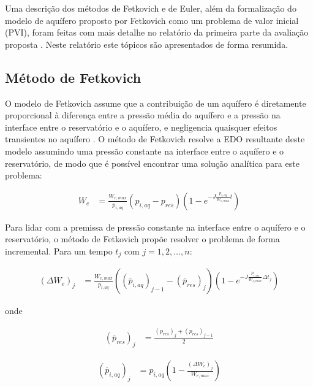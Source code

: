 \documentclass[final,5p]{elsarticle}
\numberwithin{equation}{section}
\begin{document}
        Uma descrição dos métodos de Fetkovich e de Euler, além da formalização do modelo de aquífero proposto por Fetkovich como um problema de valor inicial (PVI), foram feitas com mais detalhe no relatório da primeira parte da avaliação proposta \cite{relatorioeuler}. Neste relatório este tópicos são apresentados de forma resumida.

    \subsection{Método de Fetkovich}

        O modelo de Fetkovich assume que a contribuição de um aquífero é diretamente proporcional à diferença entre a pressão média do aquífero e a pressão na interface entre o reservatório e o aquífero, e negligencia quaisquer efeitos transientes no aquífero \cite{fetkovich1971simplified}. O método de Fetkovich resolve a EDO resultante deste modelo assumindo uma pressão constante na interface entre o aquífero e o reservatório, de modo que é possível encontrar uma solução analítica para este problema:

        \begin{align}
            W_e &= \frac{W_{e,max}}{p_{i,aq}} (p_{i,aq} - p_{res}) \left( 1- e^{-J\frac{p_{i,aq}}{W_{e,max}} t} \right) \label{eq:we}
        \end{align}

        Para lidar com a premissa de pressão constante na interface entre o aquífero e o reservatório, o método de Fetkovich propõe resolver o problema de forma incremental. Para um tempo $t_j$ com $j=1,2,\ldots,n$:

        \begin{align}
            (\Delta W_e)_j &= \frac{W_{e,max}}{p_{i,aq}} ((\overline{p}_{i,aq})_{j-1} - (\overline{p}_{res})_j) \left( 1- e^{-J\frac{p_{i,aq}}{W_{e,max}} \Delta t_j} \right) \label{eq:deltawe}
        \end{align}

        \noindent
        onde

        \begin{align}
            (\overline{p}_{res})_j &= \frac{(p_{res})_j + (p_{res})_{j-1}}{2} \label{eq:presmedio}
        \end{align}

        \begin{align}
            (\overline{p}_{i,aq})_j &= p_{i,aq} \left( 1 - \frac{(\Delta W_e)_j}{W_{e,max}} \right) \label{eq:paqmedio}
        \end{align}
\end{document}
